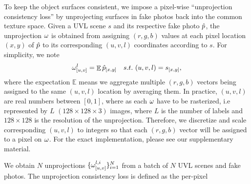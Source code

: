 \documentclass{article}
\begin{document}
		To keep the object surfaces consistent, we impose a pixel-wise ``unprojection consistency loss'' by unprojecting surfaces in fake photos back into the common texture space.
        Given a UVL scene $s$ and its respective fake photo $\hat{p}$, the unprojection $\omega$ is obtained from assigning $(r,g,b)$ values at each pixel location $(x, y)$ of $\hat{p}$ to its corresponding $(u, v, l)$ coordinates according to $s$. 
        For simplicity, we note
        \begin{equation}
            	\omega_{[u,v]}^{l}=\mathop{\mathbb{E}}\hat{p}_{[x,y]} \quad s.t.~ (u,v,l) = s_{[x,y]},
        \end{equation}
        where the expectation $\mathbb{E}$ means we aggregate multiple $(r,g,b)$ vectors being assigned to the same $(u,v,l)$ location by averaging them. 
        In practice, $(u,v,l)$ are real numbers between $[0,1]$, where as each $\omega$ have to be rasterized, i.e represented by $L$ $(128\times 128\times 3)$ images, where $L$ is the number of labels and $128\times 128$ is the resolution of the unprojection. Therefore, we discretize and scale corresponding $(u,v,l)$ to integers so that each $(r,g,b)$ vector will be assigned to a pixel on $\omega$. For the exact implementation, please see our supplementary material.
        
        We obtain $N$ unprojections $\{\omega_{[u,v]}^{l,i}\}_{i=1}^{N}$ from a batch of $N$ UVL scenes and fake photos. The unprojection consistency loss is defined as the per-pixel
        \begin{equation}
            
        \end{equation}

\end{document}
